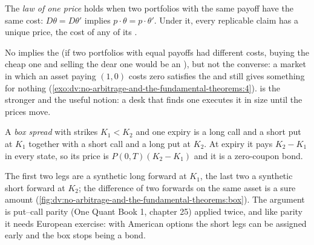 \begin{definition}\label{def:dv:no-arbitrage-and-the-fundamental-theorems:loop}
The \emph{law of one price} holds when two portfolios
with the same payoff have the same cost: $D\theta=D\theta'$ implies $p\cdot
\theta=p\cdot\theta'$. Under it, every replicable claim has a unique price, the
cost of any of its .
\end{definition}

No  implies the  (if two portfolios with equal payoffs
had different costs, buying the cheap one and selling the dear one would be an
), but not the converse: a market in which an asset paying $(1,0)$
costs zero satisfies the  and still gives something for
nothing (\cref{exo:dv:no-arbitrage-and-the-fundamental-theorems:4}). 
is the stronger and the useful notion: a desk that finds one executes it in
size until the prices move.

\begin{definition}\label{def:dv:no-arbitrage-and-the-fundamental-theorems:box}
A \emph{box spread} with strikes $K_1<K_2$ and one expiry is
a long call and a short put at $K_1$ together with a short call and a long put
at $K_2$. At expiry it pays $K_2-K_1$ in every state, so its price is
$P(0,T)(K_2-K_1)$ and it is a zero-coupon bond.
\end{definition}

The first two legs are a synthetic long forward at $K_1$, the last two a
synthetic short forward at $K_2$; the difference of two forwards on the same
asset is a sure amount (\cref{fig:dv:no-arbitrage-and-the-fundamental-theorems:box}).
The argument is put--call parity (One Quant Book 1, chapter 25) applied
twice, and like parity it needs European exercise: with American options the
short legs can be assigned early and the box stops being a bond.

